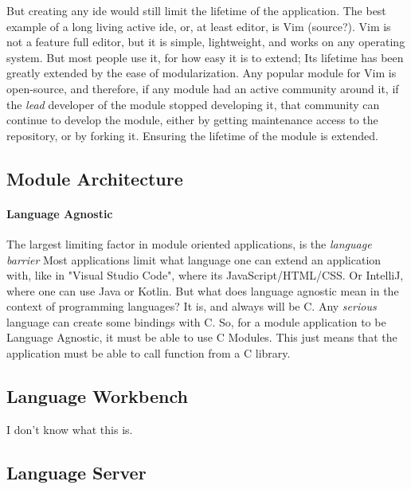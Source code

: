 But creating any \gls{ide} would still limit the lifetime of the application.
The best example of a long living active \gls{ide}, or, at least editor, is Vim
(source?). Vim is not a feature full editor, but it is simple, lightweight, and
works on any operating system. But most people use it, for how easy it is to
extend; Its lifetime has been greatly extended by the ease of modularization.
Any popular module for Vim is open-source, and therefore, if any module had an
active community around it, if the \textit{lead} developer of the module stopped
developing it, that community can continue to develop the module, either by
getting maintenance access to the repository, or by forking it. Ensuring the
lifetime of the module is extended.

\subsection{Module Architecture}


\paragraph{Language Agnostic} The largest limiting factor in module oriented
applications, is the \textit{language barrier} Most applications limit what
language one can extend an application with, like in "Visual Studio Code", where
its JavaScript/HTML/CSS. Or IntelliJ, where one can use Java or Kotlin. But what
does language agnostic mean in the context of programming languages? It is, and
always will be C. Any \textit{serious} language can create some bindings with C.
So, for a module application to be Language Agnostic, it must be able to use C
Modules. This just means that the application must be able to call function from
a C library.

\subsection{Language Workbench}
I don't know what this is.

\subsection{Language Server}

